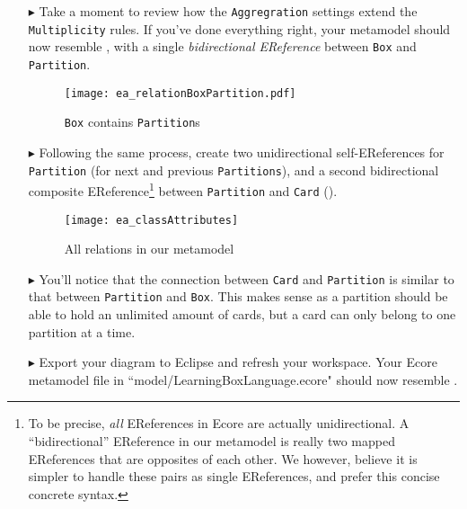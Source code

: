 \begin{itemize}
\item[$\blacktriangleright$] Take a moment to review how the \texttt{Aggregration} settings extend the \texttt{Multiplicity} rules. If you've done everything
right, your metamodel should now resemble , with a single \emph{bidirectional EReference} between \texttt{Box} and
\texttt{Partition}.

\vspace{1cm}

\begin{figure}[htbp]
	\centering
  \texttt{[image: ea\_relationBoxPartition.pdf]}
	\caption{\texttt{Box} contains \texttt{Partition}s}
	\label{ea:ereference_completed}
\end{figure}
\FloatBarrier

\item[$\blacktriangleright$] Following the same process, create two unidirectional self-EReferences for \texttt{Partition} (for next and previous \texttt{Partitions}), and a second bidirectional composite
EReference\footnote{To be precise, \emph{all} EReferences in Ecore are actually unidirectional. A ``bidirectional'' EReference in our metamodel is really two
mapped EReferences that are opposites of each other. We however, believe it is simpler to handle these pairs as single EReferences, and prefer this
concise concrete syntax.} between \texttt{Partition} and \texttt{Card} (). 

\vspace{1cm}

\begin{figure}[htbp]
	\centering
  \texttt{[image: ea\_classAttributes]}
	\caption{All relations in our metamodel}
	\label{ea:ereferences_all}
\end{figure}
\FloatBarrier

\vspace{1cm}

\item[$\blacktriangleright$] You'll notice that the connection between \texttt{Card} and \texttt{Partition} is similar to that between \texttt{Partition} and
\texttt{Box}. This makes sense as a partition should be able to hold an unlimited amount of cards, but a card can only belong to one partition at a time.

\vspace{1cm}

\item[$\blacktriangleright$] Export your diagram to Eclipse and refresh your workspace. Your Ecore metamodel file in ``model/LearningBoxLanguage.ecore" should now resemble .


\end{itemize}
